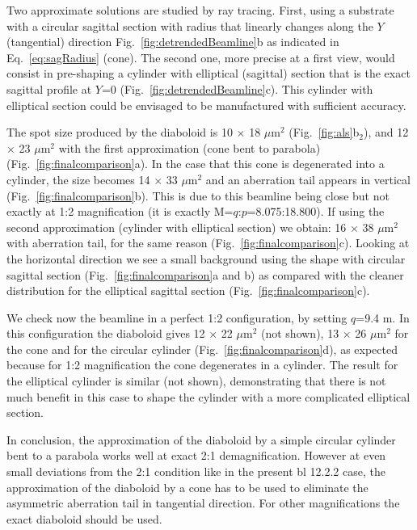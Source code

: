 \documentclass{iucr}              %
\newcommand{\inred}[1]{{\color{red}#1}}
\begin{document}
Two approximate solutions are studied by ray tracing. First, using a substrate with a circular sagittal section with radius that linearly changes along the $Y$ (tangential) direction Fig.~\ref{fig:detrendedBeamline}b as indicated in Eq.~\ref{eq:sagRadius} (cone). The second one, more precise at a first view, would consist in pre-shaping a cylinder with elliptical (sagittal) section that is the exact sagittal profile at $Y$=0 (Fig.~\ref{fig:detrendedBeamline}c).  This cylinder with elliptical section could be envisaged to be manufactured with sufficient accuracy. 

The spot size produced by the diaboloid is 10 $\times$ 18 $\mu$m$^2$ (Fig.~\ref{fig:als}b$_2$), and 12 $\times$ 23 $\mu$m$^2$ with the first approximation (cone bent to parabola) (Fig.~\ref{fig:finalcomparison}a). In the case that this cone is degenerated into a cylinder, the size becomes 14 $\times$ 33 $\mu$m$^2$ and an aberration tail appears in vertical (Fig.~\ref{fig:finalcomparison}b). This is due to this beamline being close but not exactly at 1:2 magnification (it is exactly M=$q$:$p$=8.075:18.800). If using the second approximation (cylinder with elliptical section) we obtain: 16 $\times$ 38 $\mu$m$^2$ with aberration tail, for the same reason (Fig.~\ref{fig:finalcomparison}c). Looking at the horizontal direction we see a small background using the shape with circular sagittal section (Fig.~\ref{fig:finalcomparison}a and b) as compared with the cleaner distribution for the elliptical sagittal section (Fig.~\ref{fig:finalcomparison}c). 

We check now the beamline in a perfect 1:2 configuration, by setting $q$=9.4 m. In this configuration the diaboloid gives 12 $\times$ 22 $\mu$m$^2$ (not shown), 13 $\times$ 26 $\mu$m$^2$ for the cone and for the circular cylinder (Fig.~\ref{fig:finalcomparison}d), as expected because for 1:2 magnification the cone degenerates in a cylinder. The result for the elliptical cylinder is similar (not shown), demonstrating that there is not much benefit in this case to shape the cylinder with a more complicated elliptical section.   


In conclusion, \inred{the approximation of the diaboloid by a simple circular cylinder bent to a parabola works well at exact 2:1 demagnification. However at even small deviations from the 2:1 condition like in the present bl 12.2.2 case, the approximation of the diaboloid by a cone has to be used to eliminate the asymmetric aberration tail in tangential direction. For other magnifications the exact diaboloid should be used.}
\end{document}
